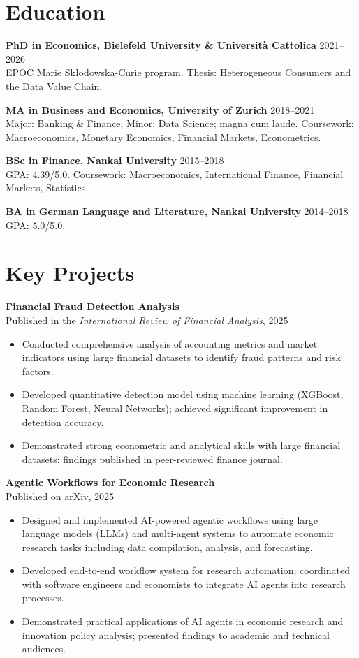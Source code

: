 \documentclass[a4paper,11pt]{article}
\newcommand{\project}[2]{%
  \textbf{#1}\\[-1pt]
  \textcolor{muted}{\small #2}\par
}
\begin{document}
 


\section{Education}
\textbf{PhD in Economics, Bielefeld University \& Universit\`a Cattolica} \hfill 2021--2026\\
EPOC Marie Sk\l odowska-Curie program. Thesis: Heterogeneous Consumers and the Data Value Chain.

\textbf{MA in Business and Economics, University of Zurich} \hfill 2018--2021\\
Major: Banking \& Finance; Minor: Data Science; magna cum laude. Coursework: Macroeconomics, Monetary Economics, Financial Markets, Econometrics.

\textbf{BSc in Finance, Nankai University} \hfill 2015--2018\\
GPA: 4.39/5.0. Coursework: Macroeconomics, International Finance, Financial Markets, Statistics.

\textbf{BA in German Language and Literature, Nankai University} \hfill 2014--2018\\
GPA: 5.0/5.0.

\section{Key Projects}
\project{Financial Fraud Detection Analysis}{Published in the \textit{International Review of Financial Analysis}, 2025}
\begin{itemize}
  \item Conducted comprehensive analysis of accounting metrics and market indicators using large financial datasets to identify fraud patterns and risk factors.
  \item Developed quantitative detection model using machine learning (XGBoost, Random Forest, Neural Networks); achieved significant improvement in detection accuracy.
  \item Demonstrated strong econometric and analytical skills with large financial datasets; findings published in peer-reviewed finance journal.
\end{itemize}


\project{Agentic Workflows for Economic Research}{Published on arXiv, 2025}
\begin{itemize}
  \item Designed and implemented AI-powered agentic workflows using large language models (LLMs) and multi-agent systems to automate economic research tasks including data compilation, analysis, and forecasting.
  \item Developed end-to-end workflow system for research automation; coordinated with software engineers and economists to integrate AI agents into research processes.
  \item Demonstrated practical applications of AI agents in economic research and innovation policy analysis; presented findings to academic and technical audiences.
\end{itemize}
\end{document}

